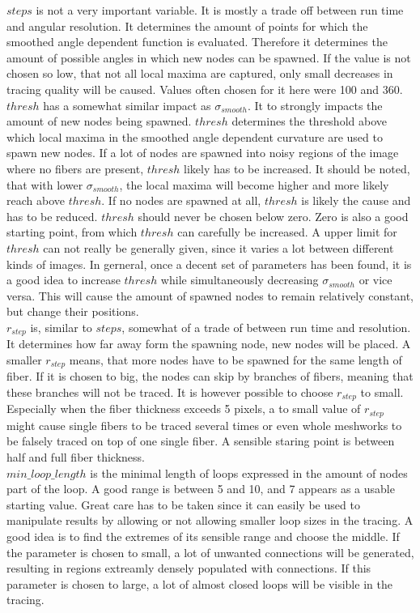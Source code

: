 \documentclass[12pt,english,twocolumn]{revtex4}
\begin{document}
$steps$ is not a very important variable. It is mostly a trade off between run time and angular resolution. It determines the amount of points for which the smoothed angle dependent function is evaluated. Therefore it determines the amount of possible angles in which new nodes can be spawned. If the value is not chosen so low, that not all local maxima are captured, only small decreases in tracing quality will be caused. Values often chosen for it here were 100 and 360.\\


$thresh$ has a somewhat similar impact as $\sigma_{smooth}$. It to strongly impacts the amount of new nodes being spawned. $thresh$ determines the threshold above which local maxima in the smoothed angle dependent curvature are used to spawn new nodes. If a lot of nodes are spawned into noisy regions of the image where no fibers are present, $thresh$ likely has to be increased. It should be noted, that with lower $\sigma_{smooth}$, the local maxima will become higher and more likely reach above $thresh$. If no nodes are spawned at all, $thresh$ is likely the cause and has to be reduced. $thresh$ should never be chosen below zero. Zero is also a good starting point, from which $thresh$ can carefully be increased. A upper limit for $thresh$ can not really be generally given, since it varies a lot between different kinds of images. In gerneral, once a decent set of parameters has been found, it is a good idea to increase $thresh$ while simultaneously decreasing $\sigma_{smooth}$ or vice versa. This will cause the amount of spawned nodes to remain relatively constant, but change their positions.\\

$r_{step}$ is, similar to $steps$, somewhat of a trade of between run time and resolution. It determines how far away form the spawning node, new nodes will be placed. A smaller $r_{step}$ means, that more nodes have to be spawned for the same length of fiber. If it is chosen to big, the nodes can skip by branches of fibers, meaning that these branches will not be traced. It is however possible to choose $r_{step}$ to small. Especially when the fiber thickness exceeds 5 pixels, a to small value of $r_{step}$ might cause single fibers to be traced several times or even whole meshworks to be falsely traced on top of one single fiber. A sensible staring point is between half and full fiber thickness.\\

$min\_loop\_length$ is the minimal length of loops expressed in the amount of nodes part of the loop. A good range is between 5 and 10, and 7 appears as a usable starting value. Great care has to be taken since it can easily be used to manipulate results by allowing or not allowing smaller loop sizes in the tracing. A good idea is to find the extremes of its sensible range and choose the middle. If the parameter is chosen to small, a lot of unwanted connections will be generated, resulting in regions extreamly densely populated with connections. If this parameter is chosen to large, a lot of almost closed loops will be visible in the tracing.
\end{document}
